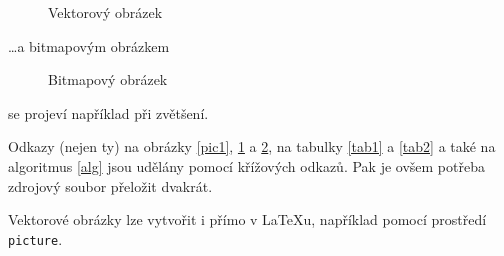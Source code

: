 \documentclass[a4paper, 11pt]{article}
\begin{document}
\begin{figure}[ht] 
    \begin{center}
        \caption{Vektorový obrázek} \label{pic2}
        
    \end{center}
\end{figure}
\dots a bitmapovým obrázkem
\begin{figure}[ht] 
    \begin{center}
        \caption{Bitmapový obrázek} \label{pic3}
    \end{center}
\end{figure}

se projeví například při zvětšení.
\par Odkazy (nejen ty) na obrázky \ref{pic1}, \ref{pic2} a \ref{pic3}, 
na tabulky \ref{tab1} a \ref{tab2} a také na algoritmus \ref{alg} jsou udělány pomocí křížových
odkazů. Pak je ovšem potřeba zdrojový soubor přeložit dvakrát.
\par Vektorové obrázky lze vytvořit i přímo v \LaTeX u, například pomocí prostředí \verb|picture|.

\pagebreak
\end{document}

